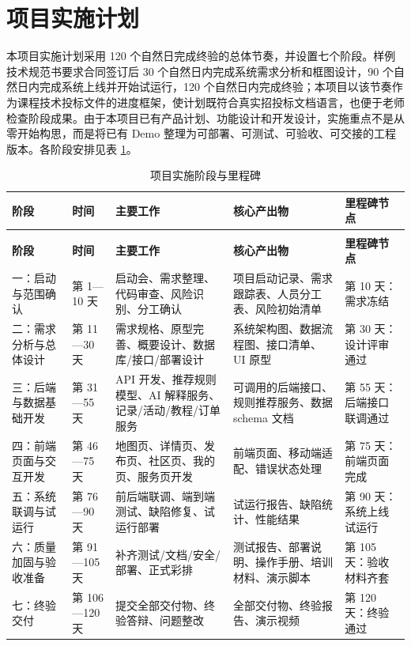 \section{项目实施计划}

本项目实施计划采用 120 个自然日完成终验的总体节奏，并设置七个阶段。样例技术规范书要求合同签订后 30 个自然日内完成系统需求分析和框图设计，90 个自然日内完成系统上线并开始试运行，120 个自然日内完成终验；本项目以该节奏作为课程技术投标文件的进度框架，使计划既符合真实招投标文档语言，也便于老师检查阶段成果。由于本项目已有产品计划、功能设计和开发设计，实施重点不是从零开始构思，而是将已有 Demo 整理为可部署、可测试、可验收、可交接的工程版本。各阶段安排见表 \ref{tab:milestones}。

{\small
  \setlength{\tabcolsep}{3pt}
  \renewcommand{\arraystretch}{1.15}
  \begin{longtable}{|>{\raggedright\arraybackslash}p{1.45cm}|>{\raggedright\arraybackslash}p{1.55cm}|>{\raggedright\arraybackslash}p{2.25cm}|>{\raggedright\arraybackslash}p{4.75cm}|>{\raggedright\arraybackslash}p{2.0cm}|}
  \caption{项目实施阶段与里程碑}
  \label{tab:milestones}\\
    \toprule
    \textbf{阶段} & \textbf{时间} & \textbf{主要工作} & \textbf{核心产出物} & \textbf{里程碑节点} \\
    \midrule
    \endfirsthead
    \multicolumn{5}{c}{\tablename~\thetable\quad（续）}\\
    \toprule
    \textbf{阶段} & \textbf{时间} & \textbf{主要工作} & \textbf{核心产出物} & \textbf{里程碑节点} \\
    \midrule
    \endhead
    \bottomrule
    \endlastfoot
    一：启动与范围确认 & 第 1—10 天 & 启动会、需求整理、代码审查、风险识别、分工确认 & 项目启动记录、需求跟踪表、人员分工表、风险初始清单 & 第 10 天：需求冻结 \\
    \hline
    二：需求分析与总体设计 & 第 11—30 天 & 需求规格、原型完善、概要设计、数据库/接口/部署设计 & 系统架构图、数据流程图、接口清单、UI 原型 & 第 30 天：设计评审通过 \\
    \hline
    三：后端与数据基础开发 & 第 31—55 天 & API 开发、推荐规则模型、AI 解释服务、记录/活动/教程/订单服务 & 可调用的后端接口、规则推荐服务、数据 schema 文档 & 第 55 天：后端接口联调通过 \\
    \hline
    四：前端页面与交互开发 & 第 46—75 天 & 地图页、详情页、发布页、社区页、我的页、服务页开发 & 前端页面、移动端适配、错误状态处理 & 第 75 天：前端页面完成 \\
    \hline
    五：系统联调与试运行 & 第 76—90 天 & 前后端联调、端到端测试、缺陷修复、试运行部署 & 试运行报告、缺陷统计、性能结果 & 第 90 天：系统上线试运行 \\
    \hline
    六：质量加固与验收准备 & 第 91—105 天 & 补齐测试/文档/安全/部署、正式彩排 & 测试报告、部署说明、操作手册、培训材料、演示脚本 & 第 105 天：验收材料齐套 \\
    \hline
    七：终验交付 & 第 106—120 天 & 提交全部交付物、终验答辩、问题整改 & 全部交付物、终验报告、演示视频 & 第 120 天：终验通过 \\
  \end{longtable}
}


